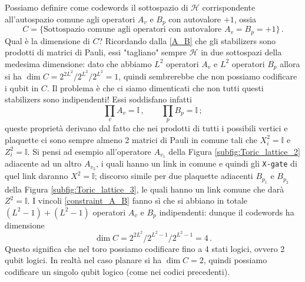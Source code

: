 \noindent Possiamo definire come codewords il sottospazio di $\mathcal{H}$ corrispondente all'autospazio comune agli operatori $A_v$ e $B_p$ con autovalore $+1$, ossia
\begin{equation*}
    C = \{ \text{Sottospazio comune agli operatori con autovalore } A_v = B_p = +1 \} \, .
\end{equation*}
Qual è la dimensione di $C$? Ricordando dalla \eqref{A_B} che gli stabilizers sono prodotti di matrici di Pauli, essi "tagliano" sempre $\mathcal{H}$ in due sottospazi della medesima dimensione: dato che abbiamo $L^2$ operatori $A_v$ e $L^2$ operatori $B_p$ allora si ha $\dim C = 2^{2L^2}/2^{L^2}/2^{L^2} = 1$, quindi sembrerebbe che non possiamo codificare i qubit in $C$. Il problema è che ci siamo dimenticati che non tutti questi stabilizers sono indipendenti! Essi soddisfano infatti
\begin{equation}\label{constraint_A_B}
    \prod_v A_v = \mathbb{I} \, , \qquad \prod_p B_p = \mathbb{I} \, ;
\end{equation}
queste proprietà derivano dal fatto che nei prodotti di tutti i possibili vertici e plaquette ci sono sempre almeno 2 matrici di Pauli in comune tali che $X_i^2 = \mathbb{I}$ e $Z_i^2 = \mathbb{I}$. Si pensi ad esempio all'operatore $A_{v_1}$ della Figura \ref{subfig:Toric_lattice_2} adiacente ad un altro $A_{v_2}$, i quali hanno un link in comune e quindi gli \texttt{X-gate} di quel link daranno $X^2 = \mathbb{I}$; discorso simile per due plaquette adiacenti $B_{p_1}$ e $B_{p_2}$ della Figura \ref{subfig:Toric_lattice_3}, le quali hanno un link comune che darà $Z^2 = \mathbb{I}$. I vincoli \eqref{constraint_A_B} fanno sì che si abbiano in totale  $(L^2-1) + (L^2-1)$ operatori $A_v$ e $B_p$ indipendenti: dunque il codewords ha dimensione 
\begin{equation*}
    \dim C = 2^{2 L^2} / 2^{L^2-1} / 2^{L^2-1} = 4 \, .
\end{equation*}
Questo significa che nel toro  possiamo codificare fino a 4 stati logici, ovvero 2 qubit logici. In realtà nel caso planare  si ha $\dim C = 2$, quindi possiamo codificare un singolo qubit logico (come nei codici precedenti). 


